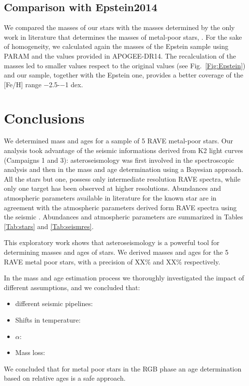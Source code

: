 \documentclass{aa}
\begin{document}
\subsection{Comparison with Epstein2014}
We compared the masses of our stars with the masses determined by the only work in literature that determines the masses of metal-poor stars, \cite{Epstein2014}. For the sake of homogeneity, we calculated again the masses of the Epstein sample using PARAM and the values provided in APOGEE-DR14. The recalculation of the masses led to smaller values respect to the original values (see Fig.~\ref{Fig:Epstein}) and our sample, together with the Epstein one, provides a better coverage of the [Fe/H] range $-$2.5-$-$1 dex.

\section{Conclusions}
\label{Sect:conclusions}

We determined mass and ages for a sample of 5 RAVE metal-poor stars. Our analysis took advantage of the seismic informations derived from K2 light curves (Campaigns 1 and 3): asteroseismology was first involved in the spectroscopic analysis and then in the mass and age determination using a Bayesian approach. All the stars but one, possess only intermediate resolution RAVE spectra, while only one target has been observed at higher resolutions. Abundances and atmospheric parameters available in literature for the known star are in agreement with the atmospheric parameters derived form RAVE spectra using the seismic \logg. Abundances and atmospheric parameters are summarized in Tables \ref{Tab:stars} and \ref{Tab:seismres}.

This exploratory work shows that asteroseismology is a powerful tool for determining masses and ages of stars. We derived masses and ages for the 5 RAVE metal poor stars, with a precision of XX\% and XX\% respectively. 

In the mass and age estimation process we thoroughly investigated the impact of different assumptions, and we concluded that:
\begin{itemize}
\item different seismic pipelines: 
\item Shifts in temperature:
\item $\alpha$:
\item Mass loss:
\end{itemize}
We concluded that for metal poor stars in the RGB phase an age determination based on relative ages is a safe approach. 
\end{document}
